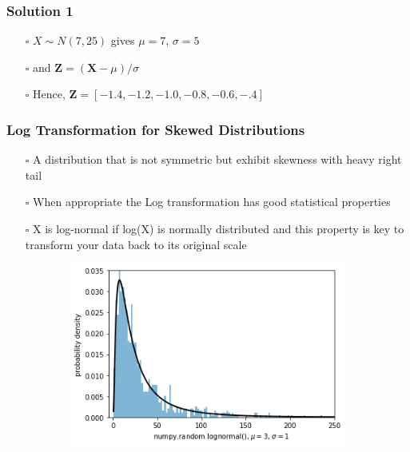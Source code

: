 \documentclass[handout]{beamer}
\begin{document}
\begin{frame}
    \frametitle{Solution 1}
    \begin{itemize}[wide = 0pt]
        \item[$\square$] $X \sim N(7,25)$ gives $\mu=7$, $\sigma=5$
        \vspace{5pt}
        \item[$\square$] and $\textbf{Z}=(\textbf{X}-\mu)/\sigma$
        \vspace{5pt}
        \item[$\square$] Hence, $\textbf{Z}=[-1.4, -1.2, -1.0, -0.8, -0.6, -.4]$
    \end{itemize} 
    \vspace{\fill}
\end{frame}

\begin{frame}
    \frametitle{Log Transformation for Skewed Distributions}
    \begin{itemize}[wide = 0pt]
        \item[$\square$] A distribution that is not symmetric but exhibit skewness with heavy right tail
        \item[$\square$] When appropriate the Log transformation has good statistical properties
        \item[$\square$] X is log-normal if log(X) is normally distributed and this property is key to transform your data back to its original scale
    \end{itemize}
    \begin{figure}
    \centering
    \begin{subfigure}{0.5\textwidth}
        \centering
        \includegraphics[width=.9\textwidth]{log1.png}
    \end{subfigure}%

\end{figure}
\end{frame}
\end{document}
